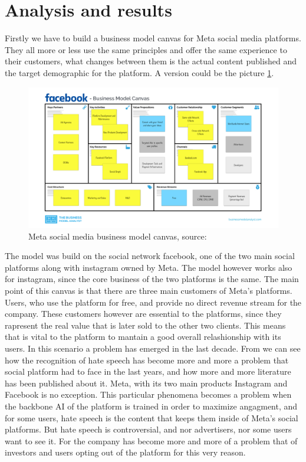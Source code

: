 \section{Analysis and results}
Firstly we have to build a business model canvas for Meta social media
platforms. They all more or less use the same principles and offer the
same experience to their customers, what changes between them is the
actual content published and the target demographic for the platform.
A version could be the picture \ref{fig:fbcanvas}.

\begin{figure}
  \centering
  \includegraphics[width=\textwidth]{images/fbcanvas.pdf}
  \caption{Meta social media business model canvas, source: \cite{site:analyst}}
  \label{fig:fbcanvas}
\end{figure}

The model was build on the social network facebook, one of the two
main social platforms along with instagram owned by Meta. The model
however works also for instagram, since the core business of the two
platforms is the same. The main point of this canvas is that there are
three main customers of Meta's platforms. Users, who use the platform
for free, and provide no direct revenue stream for the company. These
customers however are essential to the platforms, since they rapresent
the real value that is later sold to the other two clients. This means
that is vital to the platform to mantain a good overall relashionship
with its users. In this scenario a problem has emerged in the last
decade. From \cite{art:fortuna2018survey} we can see how the
recognition of hate speech has become more and more a problem that
social platform had to face in the last years, and how more and more
literature has been published about it. Meta, with its two main
products Instagram and Facebook is no exception. This particular
phenomena becomes a problem when the backbone AI of the platform is
trained in order to maximize angagment, and for some users, hate
speech is the content that keeps them inside of Meta's social
platforms. But hate speech is controversial, and nor advertisers, nor
some users want to see it. For the company has become more and more of
a problem that of investors and users opting out of the platform for
this very reason.

